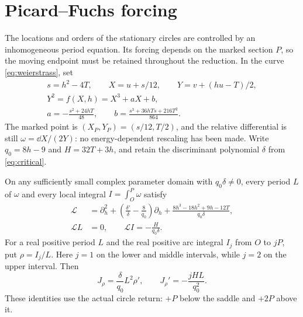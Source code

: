 \section{Picard--Fuchs forcing}\label{sec:forcing}

The locations and orders of the stationary circles are controlled by an
inhomogeneous period equation.  Its forcing depends on the marked section
$P$, so the moving endpoint must be retained throughout the reduction.
In the curve \eqref{eq:weierstrass}, set
\[
\begin{gathered}
s=h^2-4T,\qquad X=u+s/12,\qquad Y=v+(hu-T)/2,\\
Y^2=f(X,h)=X^3+aX+b,\\
a=-\frac{s^2+24hT}{48},\qquad
b=\frac{s^3+36hTs+216T^2}{864}.
\end{gathered}
\]
The marked point is $(X_P,Y_P)=(s/12,T/2)$, and the relative differential
is still $\omega=\dd X/(2Y)$: no energy-dependent rescaling has been made.
Write $q_0=8h-9$ and $H=32T+3h$, and retain the discriminant
polynomial $\delta$ from \eqref{eq:critical}.

\begin{proposition}\label{prop:pf}
On any sufficiently small complex parameter domain with $q_0\delta\ne0$,
every period $L$ of $\omega$ and every local integral
$I=\int_O^P\omega$ satisfy
\begin{align}
\mathcal L
&=\partial_h^2+\left(\frac{\delta'}{\delta}-\frac8{q_0}\right)
  \partial_h+\frac{8h^3-18h^2+9h-12T}{q_0\delta},
\label{eq:pf-operator}\\
\mathcal L L&=0,\qquad \mathcal L I=-\frac{H}{q_0\delta}.
\label{eq:pf-forcing}
\end{align}
For a real positive period $L$ and the real positive arc integral $I_j$
from $O$ to $jP$, put $\rho=I_j/L$.  Here $j=1$ on the lower and middle
intervals, while $j=2$ on the upper interval.  Then
\begin{equation}\label{eq:wronskian}
J_\rho=\frac{\delta}{q_0}L^2\rho',\qquad
J_\rho'=-\frac{jHL}{q_0^2}.
\end{equation}
These identities use the actual circle return: $+P$ below the saddle and
$+2P$ above it.
\end{proposition}

